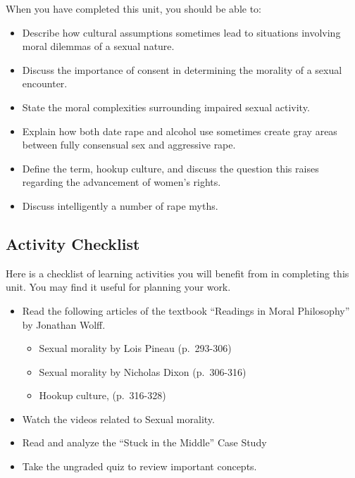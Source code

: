 \documentclass[
]{book}
\providecommand{\tightlist}{%
  \setlength{\itemsep}{0pt}\setlength{\parskip}{0pt}}
\begin{document}
When you have completed this unit, you should be able to:

\begin{itemize}
\tightlist
\item
  Describe how cultural assumptions sometimes lead to situations involving moral dilemmas of a sexual nature.
\item
  Discuss the importance of consent in determining the morality of a sexual encounter.
\item
  State the moral complexities surrounding impaired sexual activity.
\item
  Explain how both date rape and alcohol use sometimes create gray areas between fully consensual sex and aggressive rape.
\item
  Define the term, hookup culture, and discuss the question this raises regarding the advancement of women's rights.
\item
  Discuss intelligently a number of rape myths.
\end{itemize}

\hypertarget{activity-checklist-3}{%
\subsection*{Activity Checklist}\label{activity-checklist-3}}

Here is a checklist of learning activities you will benefit from in completing this unit. You may find it useful for planning your work.

\begin{itemize}
\tightlist
\item
  Read the following articles of the textbook ``Readings in Moral Philosophy'' by Jonathan Wolff.

  \begin{itemize}
  \tightlist
  \item
    Sexual morality by Lois Pineau (p.~293-306)
  \item
    Sexual morality by Nicholas Dixon (p.~306-316)
  \item
    Hookup culture, (p.~316-328)
  \end{itemize}
\item
  Watch the videos related to Sexual morality.
\item
  Read and analyze the ``Stuck in the Middle'' Case Study
\item
  Take the ungraded quiz to review important concepts.
\end{itemize}
\end{document}
